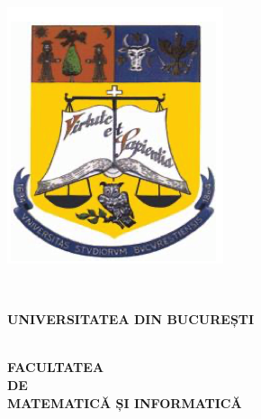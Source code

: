 \documentclass[a4paper,12pt]{report}
\begin{document}
\begin{titlepage}
    \begin{center}
        \begin{figure}[htbp]
            \centering
            \begin{minipage}{0.2\textwidth}
              \includegraphics[width=\linewidth]{images/poza_stanga.png}
            \end{minipage}\
            \begin{minipage}{0.5\textwidth}
                \begin{large}
                    \textbf{UNIVERSITATEA DIN BUCUREȘTI}\\
                    \\
                    \begin{center}
                    \textbf{FACULTATEA\\
                                DE\\
                    MATEMATICĂ ȘI INFORMATICĂ}
								\end{center}
                \end{large}
            \end{minipage}

\end{figure}
\end{center}
\end{titlepage}
\end{document}
